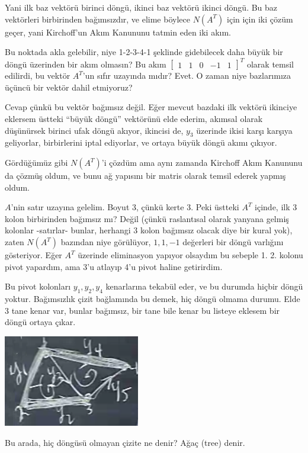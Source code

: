 \documentclass[12pt,fleqn]{article}\usepackage{../../common}
\begin{document}
Yani ilk baz vektörü birinci döngü, ikinci baz vektörü ikinci döngü. Bu baz
vektörleri birbirinden bağımsızdır, ve elime böylece $N(A^T)$ için için iki
çözüm geçer, yani Kirchoff'un Akım Kanununu tatmin eden iki akım. 

Bu noktada akla gelebilir, niye 1-2-3-4-1 şeklinde gidebilecek daha büyük
bir döngü üzerinden bir akım olmasın? Bu akım $\left[\begin{array}
 {ccccc}1&1&0&-1&1 \end{array}\right]^T$ olarak temsil edilirdi, bu vektör
$A^T$'un sıfır uzayında mıdır? Evet. O zaman niye bazlarımıza üçüncü 
bir vektör dahil etmiyoruz? 

Cevap çünkü bu vektör bağımsız değil. Eğer mevcut bazdaki ilk vektörü
ikinciye eklersem üstteki ``büyük döngü'' vektörünü elde ederim, akımsal
olarak düşünürsek birinci ufak döngü akıyor, ikincisi de, $y_3$ üzerinde
ikisi karşı karşıya geliyorlar, birbirlerini iptal ediyorlar, ve ortaya
büyük döngü akımı çıkıyor.

Gördüğümüz gibi $N(A^T)$'i çözdüm ama aynı zamanda Kirchoff Akım Kanununu
da çözmüş oldum, ve bunu ağ yapısını bir matris olarak temsil ederek yapmış
oldum. 

$A$'nin satır uzayına gelelim. Boyut 3, çünkü kerte 3. Peki üstteki $A^T$
içinde, ilk 3 kolon birbirinden bağımsız mı? Değil (çünkü raslantısal
olarak yanyana gelmiş kolonlar -satırlar- bunlar, herhangi 3 kolon bağımsız
olacak diye bir kural yok), zaten $N(A^T)$ bazından niye görülüyor,
$1,1,-1$ değerleri bir döngü varlığını gösteriyor. Eğer $A^T$ üzerinde
eliminasyon yapıyor olsaydım bu sebeple 1. 2. kolonu pivot yapardım, ama
3'u atlayıp 4'u pivot haline getirirdim.

Bu pivot kolonları $y_1,y_2,y_4$ kenarlarına tekabül eder, ve bu durumda
hiçbir döngü yoktur. Bağımsızlık çizit bağlamında bu demek, hiç döngü
olmama durumu. Elde 3 tane kenar var, bunlar bağımsız, bir tane bile kenar
bu listeye eklesem bir döngü ortaya çıkar. 

\includegraphics[height=4cm]{12_6.png}

Bu arada, hiç döngüsü olmayan çizite ne denir? Ağaç (tree) denir.
\end{document}
